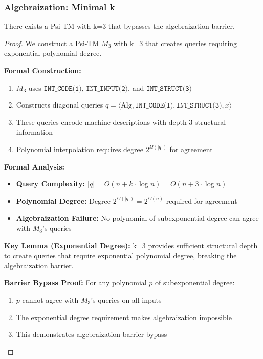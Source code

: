 \documentclass[11pt]{article}
\begin{document}
\subsubsection{Algebraization: Minimal k}

\begin{theorem}[Algebraization Bypass with k=3]
\label{thm:algebraization-k3}
There exists a Psi-TM with k=3 that bypasses the algebraization barrier.
\end{theorem}

\begin{proof}
We construct a Psi-TM $M_3$ with k=3 that creates queries requiring exponential polynomial degree.

\textbf{Formal Construction:}
\begin{enumerate}
\item $M_3$ uses $\texttt{INT\_CODE(1)}$, $\texttt{INT\_INPUT(2)}$, and $\texttt{INT\_STRUCT(3)}$
\item Constructs diagonal queries $q = \langle \text{Alg}, \texttt{INT\_CODE(1)}, \texttt{INT\_STRUCT(3)}, x \rangle$
\item These queries encode machine descriptions with depth-3 structural information
\item Polynomial interpolation requires degree $2^{\Omega(|q|)}$ for agreement
\end{enumerate}

\textbf{Formal Analysis:}
\begin{itemize}
\item \textbf{Query Complexity:} $|q| = O(n + k \cdot \log n) = O(n + 3 \cdot \log n)$
\item \textbf{Polynomial Degree:} Degree $2^{\Omega(|q|)} = 2^{\Omega(n)}$ required for agreement
\item \textbf{Algebraization Failure:} No polynomial of subexponential degree can agree with $M_3$'s queries
\end{itemize}

\textbf{Key Lemma (Exponential Degree):} k=3 provides sufficient structural depth to create queries that require exponential polynomial degree, breaking the algebraization barrier.

\textbf{Barrier Bypass Proof:}
For any polynomial $p$ of subexponential degree:
\begin{enumerate}
\item $p$ cannot agree with $M_3$'s queries on all inputs
\item The exponential degree requirement makes algebraization impossible
\item This demonstrates algebraization barrier bypass
\end{enumerate}
\end{proof}
\end{document}
